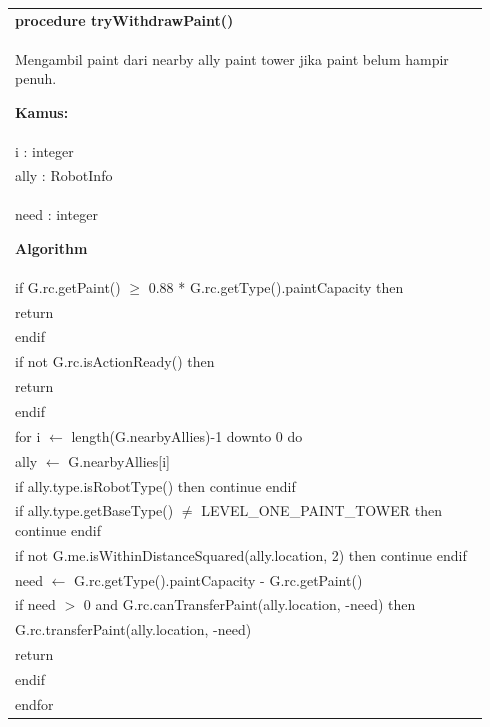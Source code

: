 \documentclass{article}
\newenvironment{pseudobox}
{
\centering
\begin{longtable}{|p{0.94\linewidth}|}
\hline
}
{
\\ \hline
\end{longtable}
\vspace{0.05cm}
}
\begin{document}
\begin{pseudobox}
\textbf{procedure tryWithdrawPaint()} \\
{ Mengambil paint dari nearby ally paint tower jika paint belum hampir penuh. }

\textbf{Kamus:} \\
\hspace*{1em} i : integer \\
\hspace*{1em} ally : RobotInfo \\
\hspace*{1em} need : integer

\textbf{Algorithm} \\
\hspace*{1em} if G.rc.getPaint() $\geq$ 0.88 * G.rc.getType().paintCapacity then \\
\hspace*{2em} return \\
\hspace*{1em} endif \\

\hspace*{1em} if not G.rc.isActionReady() then \\
\hspace*{2em} return \\
\hspace*{1em} endif \\

\hspace*{1em} for i $\leftarrow$ length(G.nearbyAllies)-1 downto 0 do \\
\hspace*{2em} ally $\leftarrow$ G.nearbyAllies[i] \\
\hspace*{2em} if ally.type.isRobotType() then continue endif \\
\hspace*{2em} if ally.type.getBaseType() $\neq$ LEVEL\_ONE\_PAINT\_TOWER then continue endif \\
\hspace*{2em} if not G.me.isWithinDistanceSquared(ally.location, 2) then continue endif \\

\hspace*{2em} need $\leftarrow$ G.rc.getType().paintCapacity - G.rc.getPaint() \\
\hspace*{2em} if need $>$ 0 and G.rc.canTransferPaint(ally.location, -need) then \\
\hspace*{3em} G.rc.transferPaint(ally.location, -need) \\
\hspace*{3em} return \\
\hspace*{2em} endif \\
\hspace*{1em} endfor
\end{pseudobox}
\end{document}

